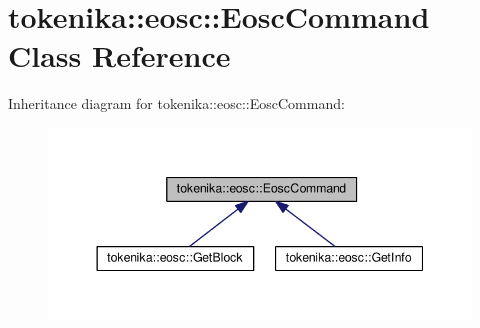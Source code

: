 \hypertarget{classtokenika_1_1eosc_1_1_eosc_command}{}\section{tokenika\+:\+:eosc\+:\+:Eosc\+Command Class Reference}
\label{classtokenika_1_1eosc_1_1_eosc_command}


Inheritance diagram for tokenika\+:\+:eosc\+:\+:Eosc\+Command\+:\nopagebreak
\begin{figure}[H]
\begin{center}
\leavevmode
\includegraphics[width=344pt]{classtokenika_1_1eosc_1_1_eosc_command__inherit__graph}
\end{center}
\end{figure}
